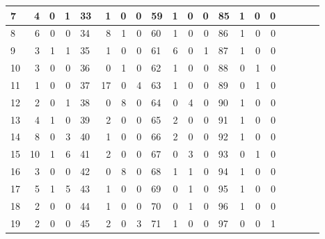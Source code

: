 \begin{table}[htbp]
\begin{tabular}{lrrrlrrrlrrrlrrrlrrr}
      \midrule
    7       & 4       & 0       & 1	&33       & 1       & 0       & 0	& 59       & 1       & 0       & 0	& 85       & 1       & 0       & 0	 \\
      \midrule
    8       & 6       & 0       & 0	& 34       & 8       & 1       & 0	& 60       & 1       & 0       & 0	& 86       & 1       & 0       & 0	 \\
      \midrule
    9       & 3       & 1       & 1	& 35       & 1       & 0       & 0	& 61       & 6       & 0       & 1	& 87       & 1       & 0       & 0	 \\
      \midrule
    10       & 3       & 0       & 0	& 36       & 0       & 1       & 0	& 62       & 1       & 0       & 0	& 88       & 0       & 1       & 0	 \\
      \midrule
    11       & 1       & 0       & 0	& 37       & 17       & 0       & 4	& 63       & 1       & 0       & 0	& 89       & 0       & 1       & 0	 \\
      \midrule
    12       & 2       & 0       & 1	& 38       & 0       & 8       & 0	& 64       & 0       & 4       & 0	& 90       & 1       & 0       & 0	 \\
      \midrule
    13       & 4       & 1       & 0	& 39       & 2       & 0       & 0	& 65       & 2       & 0       & 0	& 91       & 1       & 0       & 0	 \\
      \midrule
    14       & 8       & 0       & 3	& 40       & 1       & 0       & 0	& 66       & 2       & 0       & 0	& 92       & 1       & 0       & 0	 \\
      \midrule
    15       & 10       & 1       & 6	& 41       & 2       & 0       & 0	& 67       & 0       & 3       & 0	& 93       & 0       & 1       & 0	 \\
      \midrule
    16       & 3       & 0       & 0	& 42       & 0       & 8       & 0	& 68       & 1       & 1       & 0	& 94       & 1       & 0       & 0	 \\
      \midrule
    17       & 5       & 1       & 5	& 43       & 1       & 0       & 0	& 69       & 0       & 1       & 0	& 95       & 1       & 0       & 0	 \\
      \midrule
    18       & 2       & 0       & 0	& 44       & 1       & 0       & 0	& 70       & 0       & 1       & 0	& 96       & 1       & 0       & 0	 \\
      \midrule
    19       & 2       & 0       & 0	& 45       & 2       & 0       & 3	& 71       & 1       & 0       & 0	& 97       & 0       & 0       & 1	 \\

\end{tabular}
\end{table}
